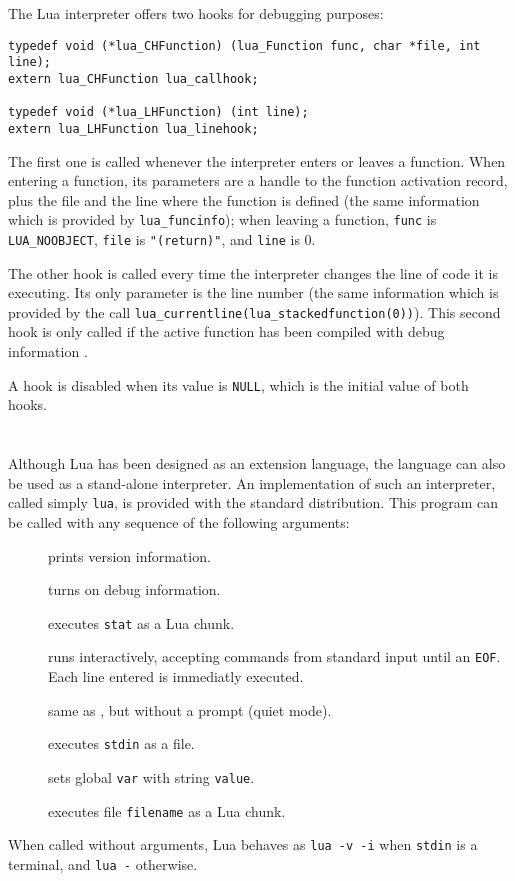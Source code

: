 The Lua interpreter offers two hooks for debugging purposes:
\begin{verbatim}
typedef void (*lua_CHFunction) (lua_Function func, char *file, int line);
extern lua_CHFunction lua_callhook;

typedef void (*lua_LHFunction) (int line);
extern lua_LHFunction lua_linehook;
\end{verbatim}
The first one is called whenever the interpreter enters or leaves a
function.
When entering a function,
its parameters are a handle to the function activation record,
plus the file and the line where the function is defined (the same
information which is provided by \verb|lua_funcinfo|);
when leaving a function, \verb|func| is \verb|LUA_NOOBJECT|,
\verb|file| is \verb|"(return)"|, and \verb|line| is 0.

The other hook is called every time the interpreter changes
the line of code it is executing.
Its only parameter is the line number
(the same information which is provided by the call
\verb|lua_currentline(lua_stackedfunction(0))|).
This second hook is only called if the active function
has been compiled with debug information .

A hook is disabled when its value is \verb|NULL|,
which is the initial value of both hooks.



\section{} \label{lua-sa}

Although Lua has been designed as an extension language,
the language can also be used as a stand-alone interpreter.
An implementation of such an interpreter,
called simply \verb|lua|,
is provided with the standard distribution.
This program can be called with any sequence of the following arguments:
\begin{description}
\item[] prints version information.
\item[] turns on debug information.
\item[] executes \verb|stat| as a Lua chunk.
\item[] runs interactively,
accepting commands from standard input until an \verb|EOF|.
Each line entered is immediatly executed.
\item[] same as , but without a prompt (quiet mode).
\item[\T{-}] executes \verb|stdin| as a file.
\item[] sets global \verb|var| with string \verb|value|.
\item[] executes file \verb|filename| as a Lua chunk.
\end{description}
When called without arguments,
Lua behaves as \verb|lua -v -i| when \verb|stdin| is a terminal,
and \verb|lua -| otherwise.

